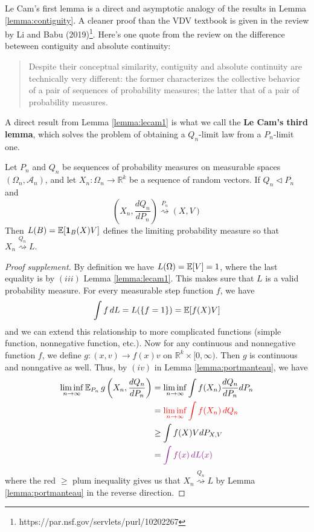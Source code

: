 \documentclass{article}
\begin{document}
Le Cam's first lemma is a direct and asymptotic analogy of the results in Lemma \ref{lemma:contiguity}. A cleaner proof than the VDV textbook is given in the review by Li and Babu (2019)\footnote{https://par.nsf.gov/servlets/purl/10202267}. Here's one quote from the review on the difference beteween contiguity and absolute continuity:
\begin{quote}
    Despite their conceptual similarity, contiguity and absolute continuity are technically very different: the former characterizes the collective behavior of a pair of sequences of probability measures; the latter that of a pair of probability measures.
\end{quote}
A direct result from Lemma \ref{lemma:lecam1} is what we call the \textbf{Le Cam's third lemma}, which solves the problem of obtaining a $Q_n$-limit law from a $P_n$-limit one.
\begin{lemma}
    Let \(P_n\) and \(Q_n\) be sequences of probability measures on measurable spaces \((\Omega_n, \mathcal{A}_n)\), and let $X_n: \Omega_n \to \mathbb{R}^k$ be a sequence of random vectors. If \(Q_n \triangleleft P_n\) and 
    \begin{equation}
        \left( X_n, \frac{dQ_n}{dP_n} \right) \overset{P_n}{\rightsquigarrow} (X, V)
    \end{equation}
    Then $L(B) = \mathbb{E} [\mathbf{1}_B(X)V]$ defines the limiting probability measure so that $X_n \overset{Q_n}{\rightsquigarrow} L$.
\end{lemma}  
\begin{proof}[Proof supplement]
    By definition we have $L(\Omega) = \mathbb{E}[V] = 1$, where the last equality is by $(iii)$ Lemma \ref{lemma:lecam1}. This makes sure that $L$ is a valid probability measure. For every measurable step function $f$, we have
    \begin{equation}
        \int f \, dL = L(\left\{ f = 1 \right\})= \mathbb{E}[f(X)V]
    \end{equation}
    and we can extend this relationship to more complicated functions (simple function, nonnegative function, etc.). Now for any continuous and nonnegative function $f$, we define $g: (x, v) \to f(x)v$ on $\mathbb{R}^k \times [0, \infty)$. Then $g$ is continuous and nonngative as well. Thus, by $(iv)$ in Lemma \ref{lemma:portmanteau}, we have 
    \begin{align}
        \liminf_{n\to\infty} \E_{P_n}\, g\left( X_n, \frac{dQ_n}{dP_n} \right) &=  \liminf_{n\to\infty} \int f(X_n)\frac{dQ_n}{dP_n} dP_n\\ 
        & = \color{red} \liminf_{n\to\infty} \int f(X_n) \,dQ_n\\ 
        & \geq \int f(X) V dP_{X, V} \\
        & = \color{Plum} \int f(x) \, dL(x)
    \end{align}
    where the {\color{red}red} $\geq$ {\color{Plum}plum} inequality gives us that $X_n \overset{Q_n}{\rightsquigarrow} L$ by Lemma \ref{lemma:portmanteau} in the reverse direction.
\end{proof}
\end{document}

